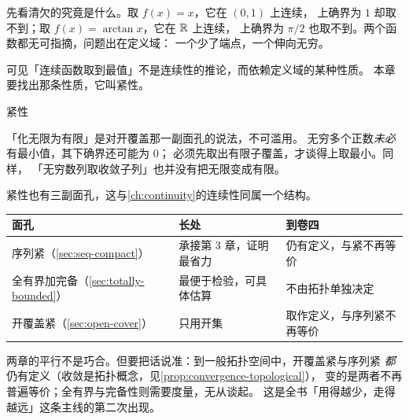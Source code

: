 先看清欠的究竟是什么。取 \(f(x)=x\)，它在 \((0,1)\) 上连续，
上确界为 \(1\) 却取不到；取 \(f(x)=\arctan x\)，它在 \(\mathbb{R}\) 上连续，
上确界为 \(\pi/2\) 也取不到。两个函数都无可指摘，问题出在定义域：
一个少了端点，一个伸向无穷。

可见「连续函数取到最值」不是连续性的推论，而依赖定义域的某种性质。
本章要找出那条性质，它叫紧性。

\begin{concept}{紧性}
\end{concept}

\begin{pitfall}
  「化无限为有限」是对开覆盖那一副面孔的说法，不可滥用。
  无穷多个正数\emph{未必}有最小值，其下确界还可能为 \(0\)；
  必须先取出有限子覆盖，才谈得上取最小。同样，
  「无穷数列取收敛子列」也并没有把无限变成有限。
\end{pitfall}

紧性也有三副面孔，这与\cref{ch:continuity}的连续性同属一个结构。

\begin{center}
\begin{tabular}{@{}lll@{}}
  \toprule
  面孔 & 长处 & 到卷四 \\
  \midrule
  序列紧（\cref{sec:seq-compact}） & 承接第 3 章，证明最省力 & 仍有定义，与紧不再等价 \\
  全有界加完备（\cref{sec:totally-bounded}） & 最便于检验，可具体估算 & 不由拓扑单独决定 \\
  开覆盖紧（\cref{sec:open-cover}） & 只用开集 & 取作定义，与序列紧不再等价 \\
  \bottomrule
\end{tabular}
\end{center}

两章的平行不是巧合。但要把话说准：到一般拓扑空间中，开覆盖紧与序列紧%
\emph{都}仍有定义（收敛是拓扑概念，见\cref{prop:convergence-topological}），
变的是两者不再普遍等价；全有界与完备性则需要度量，无从谈起。
这是全书「用得越少，走得越远」这条主线的第二次出现。

